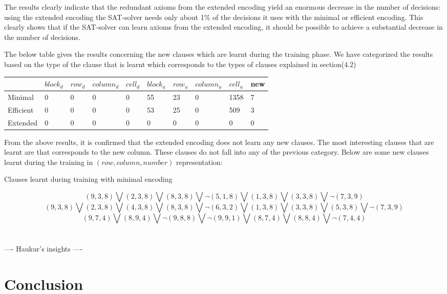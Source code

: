 \documentclass{article}
\begin{document}
The results clearly indicate that the redundant axioms from the extended encoding yield an enormous decrease in the number of decisions: using the extended encoding the SAT-solver needs only about 1\% of the decisions it uses with the minimal or efficient encoding. This clearly shows that if the SAT-solver can learn axioms from the extended encoding, it should be possible to achieve a substantial decrease in the number of decisions.


\bigskip

The below table gives the results concerning the new clauses which are learnt during the training phase. We have categorized the results based on the type of the clause that is learnt which corresponds to the types of clauses explained in section(4.2)

\begin{center}
 \label{tab:title} 
\begin{tabular}{ | l | l | l | l | l | l | l | l | l | l |}
	\hline
     & $block_{d}$ & $row_{d}$ & $column_{d}$ & $cell_{d}$ & $block_{u}$ & $row_{u}$ & $column_{u}$ & $cell_{u}$ & new \\ \hline
    Minimal & 0 & 0 & 0 & 0 & 55 & 23 & 0 & 1358  & 7 \\ \hline
    Efficient & 0 & 0 & 0 & 0 & 53 & 25 & 0 & 509  & 3  \\ \hline
    Extended & 0 & 0 & 0 & 0 & 0 & 0 & 0 & 0 & 0 \\
    \hline
\end{tabular}
\end{center}
\bigskip

From the above results, it is confirmed that the extended encoding does not learn any new clauses. The most interesting clauses that are learnt are that corresponds to the new column. These clauses do not fall into any of the previous category. Below are some new clauses learnt during the training in $(row, column, number)$ representation:

\begin{center}
Clauses learnt during training with minimal encoding 
\end{center}
\[(9, 3, 8 ) \bigvee (2, 3, 8 ) \bigvee (8, 3, 8 ) \bigvee \neg (5, 1, 8 ) \bigvee (1, 3, 8 ) \bigvee (3, 3, 8 ) \bigvee \neg (7, 3, 9 ) \]
\[(9, 3, 8) \bigvee (2, 3, 8) \bigvee (4, 3, 8) \bigvee (8, 3, 8) \bigvee \neg (6, 3, 2) \bigvee (1, 3, 8) \bigvee (3, 3, 8) \bigvee (5, 3, 8) \bigvee \neg (7, 3, 9)\]
\[(9, 7, 4) \bigvee (8, 9, 4) \bigvee \neg (9, 8, 8) \bigvee \neg (9, 9, 1) \bigvee (8, 7, 4) \bigvee (8, 8, 4) \bigvee \neg (7, 4, 4)\] \\\\


---- Haukur's insights ----

\section{Conclusion} \label{conclusion}




\end{document}
